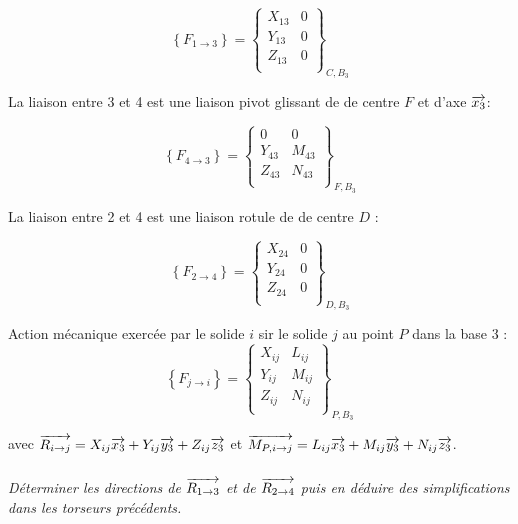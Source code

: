 \documentclass[10pt,fleqn]{article} %
\begin{document}
\begin{multicols}{2}
{\begin{corrige}
$$
\left\{
F_{1 \rightarrow 3} 
\right\}=
\left\{
\begin{array}{cc}
X_{13} & 0 \\
Y_{13} & 0 \\
Z_{13} & 0 \\
\end{array}
\right\}_{C,B_3}
$$

La liaison entre 3 et 4 est une liaison pivot glissant de de centre $F$ et d'axe $\overrightarrow{x_3}$: 

$$
\left\{
F_{4 \rightarrow 3} 
\right\}=
\left\{
\begin{array}{cc}
0 & 0 \\
Y_{43} & M_{43} \\
Z_{43} & N_{43} \\
\end{array}
\right\}_{F,B_3}
$$

La liaison entre 2 et 4 est une liaison rotule de de centre $D$ : 

$$
\left\{
F_{2 \rightarrow 4} 
\right\}=
\left\{
\begin{array}{cc}
X_{24} & 0 \\
Y_{24} & 0 \\
Z_{24} & 0 \\
\end{array}
\right\}_{D,B_3}
$$
\end{corrige}}{}

Action mécanique exercée par le solide $i$ sir le solide $j$ au point $P$ dans la base 3 :
$$
\left\{
F_{j \rightarrow i} 
\right\}=
\left\{
\begin{array}{cc}
X_{ij} & L_{ij} \\
Y_{ij} & M_{ij} \\
Z_{ij} & N_{ij} \\
\end{array}
\right\}_{P,B_3}
$$

avec $\overrightarrow{R_{i\rightarrow j}} = X_{ij}\overrightarrow{x_3}+Y_{ij}\overrightarrow{y_3}+Z_{ij}\overrightarrow{z_3}$ et 
$\overrightarrow{M_{P, i\rightarrow j}} = L_{ij}\overrightarrow{x_3}+M_{ij}\overrightarrow{y_3}+N_{ij}\overrightarrow{z_3} $.

\subparagraph{}
\textit{Déterminer les directions de $\overrightarrow{R_{1\rightarrow 3}}$ et de $\overrightarrow{R_{2\rightarrow 4}}$ puis en déduire des simplifications dans les torseurs précédents.}
\end{multicols}
\end{document}
